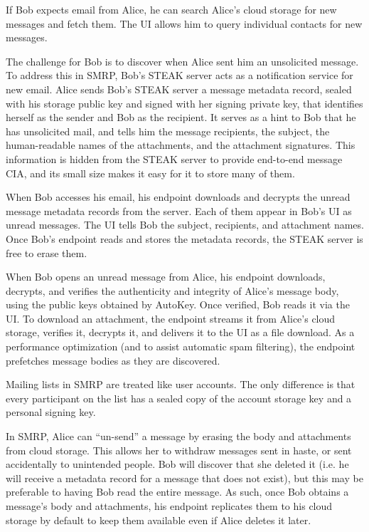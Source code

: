 If Bob expects email from Alice, he can search Alice's cloud storage for new messages and fetch them.  The UI allows him to query individual contacts for new messages.

The challenge for Bob is to discover when Alice sent him an unsolicited message.  To address this in SMRP, Bob's STEAK server acts as a notification service for new email.  Alice sends Bob's STEAK server a message metadata record, sealed with his storage public key and signed with her signing private key, that identifies herself as the sender and Bob as the recipient.  It serves as a hint to Bob that he has unsolicited mail, and tells him the message recipients, the subject, the human-readable names of the attachments, and the attachment signatures.  This information is hidden from the STEAK server to provide end-to-end message CIA, and its small size makes it easy for it to store many of them.

When Bob accesses his email, his endpoint downloads and decrypts the unread message metadata records from the server.  Each of them appear in Bob's UI as unread messages. The UI tells Bob the subject, recipients, and attachment names.  Once Bob's endpoint reads and stores the metadata records, the STEAK server is free to erase them.  

When Bob opens an unread message from Alice, his endpoint downloads, decrypts, and verifies the authenticity and integrity of Alice's message body, using the public keys obtained by AutoKey. Once verified, Bob reads it via the UI. To download an attachment, the endpoint streams it from Alice's cloud storage, verifies it, decrypts it, and delivers it to the UI as a file download.  As a performance optimization (and to assist automatic spam filtering), the endpoint prefetches message bodies as they are discovered.

Mailing lists in SMRP are treated like user accounts.  The only difference is that every participant on the list has a sealed copy of the account storage key and a personal signing key.

In SMRP, Alice can ``un-send'' a message by erasing the body and attachments from cloud storage.  This allows her to withdraw messages sent in haste, or sent accidentally to unintended people.  Bob will discover that she deleted it (i.e. he will receive a metadata record for a message that does not exist), but this may be preferable to having Bob read the entire message.  As such, once Bob obtains a message's body and attachments, his endpoint replicates them to his cloud storage by default to keep them available even if Alice deletes it later.

